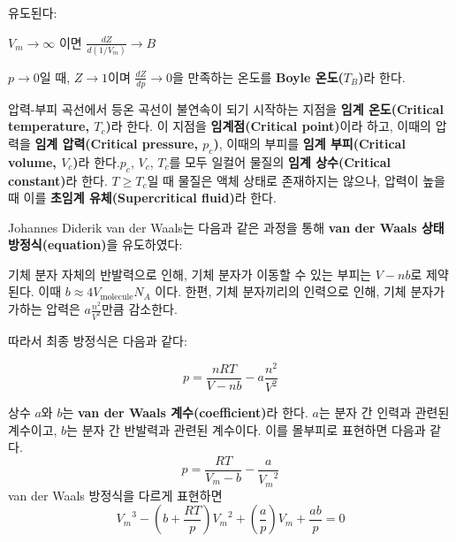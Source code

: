             유도된다:
            \begin{obs}
                    $V_m \rightarrow \infty$ 이면 $\displaystyle\frac{dZ}{d\left(1/V_m\right)} \rightarrow B$ 
            \end{obs}
            $p \to 0$일 때, $Z \to 1$이며 $\displaystyle\frac{dZ}{dp} \to 0$을 만족하는 온도를 \textbf{Boyle 온도($T_B$)}라 한다.
            \par 압력-부피 곡선에서 등온 곡선이 불연속이 되기 시작하는 지점을 \textbf{임계 온도(Critical temperature, $T_c$)}라 한다. 
            이 지점을 \textbf{임계점(Critical point)}이라 하고, 이때의 압력을 \textbf{임계 압력(Critical pressure, $p_c$)}, 
            이때의 부피를 \textbf{임계 부피(Critical volume, $V_c$)}라 한다.$p_c$, $V_c$, $T_c$를 모두 일컬어 물질의 
            \textbf{임계 상수(Critical constant)}라 한다. $T \geq T_c$일 때 물질은 액체 상태로 존재하지는 않으나, 압력이 높을 때 이를 
            \textbf{초임계 유체(Supercritical fluid)}라 한다.
            \par Johannes Diderik van der Waals는 다음과 같은 과정을 통해 \textbf{van der Waals 상태방정식(equation)}을 유도하였다:
            \begin{obs}
            기체 분자 자체의 반발력으로 인해, 기체 분자가 이동할 수 있는 부피는 $V-nb$로 제약된다. 이때 $b \approx 4 V_{\textrm{molecule}} N_A$
            이다. 한편, 기체 분자끼리의 인력으로 인해, 기체 분자가 가하는 압력은 $a \frac{n^2}{V^2}$만큼 감소한다.
            \end{obs}
            따라서 최종 방정식은 다음과 같다:
            \begin{law}
                \begin{equation*}
                    p = \frac{nRT}{V-nb} - a \frac{n^2}{V^2}
                \end{equation*}
            \end{law}
            상수 $a$와 $b$는 \textbf{van der Waals 계수(coefficient)}라 한다. $a$는 분자 간 인력과 관련된 계수이고, $b$는 분자 간 반발력과 
            관련된 계수이다. 이를 몰부피로 표현하면 다음과 같다.
                \begin{equation*}
                    p = \frac{RT}{V_m - b} - \frac{a}{{V_m}^2}
                \end{equation*}
            van der Waals 방정식을 다르게 표현하면
                \begin{equation*}
                    {V_m}^3 - \left(b+\frac{RT}{p}\right) {V_m}^2 + \left(\frac{a}{p}\right) V_m + \frac{ab}{p} = 0
                \end{equation*}
